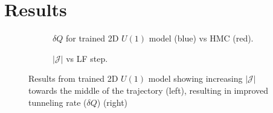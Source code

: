 \documentclass[a4paper,11pt]{article}
\begin{document}
\section{\label{sec:results}Results}
%
\begin{figure}[htpb!]
    \centering
    \hfill
    \begin{subfigure}{0.55\textwidth}
        
        \caption{\label{subfig:dqhist}$\delta Q$ for trained 2D $U(1)$ model (blue) vs HMC (red).}
    \end{subfigure}
    \hfill
    \begin{subfigure}{0.35\textwidth}
        
        \caption{\label{subfig:logdet2du1}$|\mathcal{J}|$ vs LF step.}
    \end{subfigure}
    \caption{\label{fig:2dU1}Results from trained 2D $U(1)$ model showing increasing $|\mathcal{J}|$ towards the middle of the trajectory (left), resulting in improved tunneling rate ($\delta Q$) (right) }
\end{figure}
%
\end{document}
